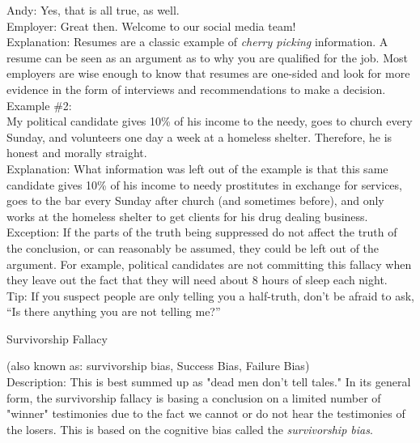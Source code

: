 \documentclass[a4paper,12pt,single,pdftex]{scrbook}
\begin{document}
{    
      Andy: Yes, that is all true, as well.
    \\

    
      Employer: Great then.  Welcome to our social media team!
    \\

    
      Explanation: Resumes are a classic example of {\it cherry picking}  information.  A resume can be seen as an argument as to why you are qualified for the job.  Most employers are wise enough to know that resumes are one-sided and look for more evidence in the form of interviews and recommendations to make a decision.
    \\

    
      Example \#2:
    \\

    
      My political candidate gives 10\% of his income to the needy, goes to church every Sunday, and volunteers one day a week at a homeless shelter.  Therefore, he is honest and morally straight.
    \\

    
      Explanation: What information was left out of the example is that this same candidate gives 10\% of his income to needy prostitutes in exchange for services, goes to the bar every Sunday after church (and sometimes before), and only works at the homeless shelter to get clients for his drug dealing business.
    \\

    
      Exception: If the parts of the truth being suppressed do not affect the truth of the conclusion, or can reasonably be assumed, they could be left out of the argument.  For example, political candidates are not committing this fallacy when they leave out the fact that they will need about 8 hours of sleep each night.
    \\

    
      Tip: If you suspect people are only telling you a half-truth, don’t be afraid to ask, “Is there anything you are not telling me?”
    \\

  }


Survivorship Fallacy
    
      (also known as: survivorship bias, Success Bias, Failure Bias)
    \\

  
    Description: This is best summed up as "dead men don't tell tales." In its general form, the survivorship fallacy is basing a conclusion on a limited number of "winner" testimonies due to the fact we cannot or do not hear the testimonies of the losers. This is based on the cognitive bias called the {\it survivorship bias}.
\end{document}
